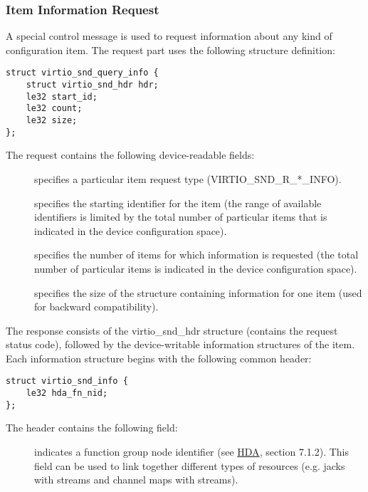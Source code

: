 \subsubsection{Item Information Request}\label{sec:Device Types / Sound Device / Device Operation / Item Information Request}

A special control message is used to request information about any kind of
configuration item. The request part uses the following structure definition:

\begin{lstlisting}
struct virtio_snd_query_info {
    struct virtio_snd_hdr hdr;
    le32 start_id;
    le32 count;
    le32 size;
};
\end{lstlisting}

The request contains the following device-readable fields:

\begin{description}
\item[] specifies a particular item request type (VIRTIO_SND_R_*_INFO).
\item[] specifies the starting identifier for the item (the range
of available identifiers is limited by the total number of particular items that
is indicated in the device configuration space).
\item[] specifies the number of items for which information is
requested (the total number of particular items is indicated in the device
configuration space).
\item[] specifies the size of the structure containing information
for one item (used for backward compatibility).
\end{description}

The response consists of the virtio_snd_hdr structure (contains the request
status code), followed by the device-writable information structures of the
item. Each information structure begins with the following common header:

\begin{lstlisting}
struct virtio_snd_info {
    le32 hda_fn_nid;
};
\end{lstlisting}

The header contains the following field:

\begin{description}
\item[] indicates a function group node identifier
(see \hyperref[intro:HDA]{HDA}, section 7.1.2). This field can be used to link
together different types of resources (e.g. jacks with streams and channel maps
with streams).
\end{description}

